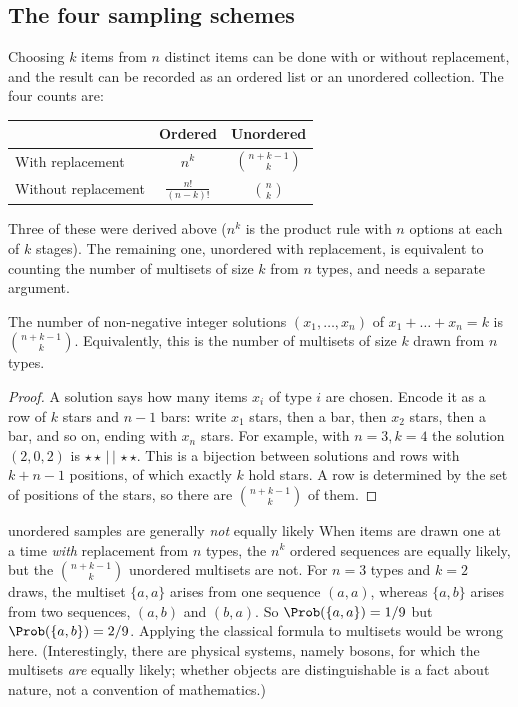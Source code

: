 \subsection{The four sampling schemes}

Choosing $k$ items from $n$ distinct items can be done with or without
replacement, and the result can be recorded as an ordered list or an unordered
collection. The four counts are:

\begin{center}
\begin{tabular}{@{}lcc@{}}
\toprule
 & Ordered & Unordered \\
\midrule
With replacement & $n^k$ & $\displaystyle\binom{n+k-1}{k}$ \\[0.6em]
Without replacement & $\displaystyle\frac{n!}{(n-k)!}$ & $\displaystyle\binom nk$ \\
\bottomrule
\end{tabular}
\end{center}

Three of these were derived above ($n^k$ is the product rule with $n$ options at
each of $k$ stages). The remaining one, unordered with replacement, is
equivalent to counting the number of multisets of size $k$ from $n$ types, and
needs a separate argument.

\begin{theorem}\label{thm:starsbars}
The number of non-negative integer solutions $(x_1,\dots,x_n)$ of
$x_1+\dots+x_n=k$ is $\binom{n+k-1}{k}$. Equivalently, this is the number of
multisets of size $k$ drawn from $n$ types.
\end{theorem}
\begin{proof}
A solution says how many items $x_i$ of type $i$ are chosen. Encode it as a row
of $k$ stars and $n-1$ bars: write $x_1$ stars, then a bar, then $x_2$ stars,
then a bar, and so on, ending with $x_n$ stars. For example, with $n=3,k=4$ the
solution $(2,0,2)$ is $\star\star\,|\,|\,\star\star$. This is a bijection between
solutions and rows with $k+n-1$ positions, of which exactly $k$ hold stars. A
row is determined by the set of positions of the stars, so there are
$\binom{n+k-1}{k}$ of them.
\end{proof}

\begin{nuance}{unordered samples are generally \emph{not} equally likely}
When items are drawn one at a time \emph{with} replacement from $n$ types, the
$n^k$ ordered sequences are equally likely, but the $\binom{n+k-1}{k}$ unordered
multisets are not. For $n=3$ types and $k=2$ draws, the multiset $\{a,a\}$
arises from one sequence $(a,a)$, whereas $\{a,b\}$ arises from two sequences,
$(a,b)$ and $(b,a)$. So $\Prob(\{a,a\})=1/9$ but $\Prob(\{a,b\})=2/9$. Applying
the classical formula to multisets would be wrong here. (Interestingly, there
are physical systems, namely bosons, for which the multisets \emph{are}
equally likely; whether objects are distinguishable is a fact about nature,
not a convention of mathematics.)
\end{nuance}

